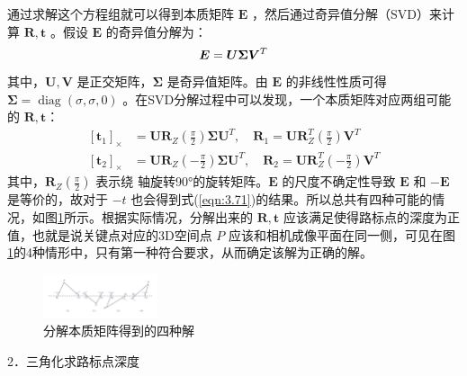 通过求解这个方程组就可以得到本质矩阵  $\bm{E} $ ，然后通过奇异值分解（SVD）来计算 $\boldsymbol{R}, \boldsymbol{t} $ 。假设  $\bm{E} $  的奇异值分解为：
\begin{equation}
\label{eqn:3.70}
\setlength{\abovedisplayskip}{6pt}
\setlength{\belowdisplayskip}{6pt}
\boldsymbol{E}= \boldsymbol{U} \boldsymbol{\Sigma} \boldsymbol{V}^{T}
\end{equation}
其中，$\boldsymbol{U},\boldsymbol{V} $ 是正交矩阵，$\boldsymbol{\Sigma} $ 是奇异值矩阵。由 $\bm{E} $ 的非线性性质可得 $\boldsymbol{\Sigma}=\operatorname{diag}(\sigma, \sigma, 0) $ 。在SVD分解过程中可以发现，一个本质矩阵对应两组可能的 $\boldsymbol{R}, \boldsymbol{t} $：
\begin{equation}
\label{eqn:3.71}
\begin{aligned}
\left[\boldsymbol{t}_{1}\right]_\times&= \boldsymbol{U} \boldsymbol{R}_{Z}\left(\frac{\pi}{2}\right) \boldsymbol{\Sigma} \boldsymbol{U}^{T}, \quad \boldsymbol{R}_{1}=\boldsymbol{U} \boldsymbol{R}_{Z}^{T}\left(\frac{\pi}{2}\right) \boldsymbol{V}^{T} \\
\left[\boldsymbol{t}_{2}\right]_\times &= \boldsymbol{U} \boldsymbol{R}_{Z}\left(-\frac{\pi}{2}\right) \boldsymbol{\Sigma} \boldsymbol{U}^{T}, \quad \boldsymbol{R}_{2}=\boldsymbol{U} \boldsymbol{R}_{Z}^{T}\left(-\frac{\pi}{2}\right) \boldsymbol{V}^{T} 
\end{aligned}
\end{equation}
其中，$\boldsymbol{R}_{Z}\left(\frac{\pi}{2}\right) $ 表示绕 轴旋转90°的旋转矩阵。$\bm{E} $ 的尺度不确定性导致 $\bm{E} $ 和 $-\bm{E} $ 是等价的，故对于 $-t$ 也会得到式(\ref{eqn:3.71})的结果。所以总共有四种可能的情况，如图\ref{fig3_9}所示。根据实际情况，分解出来的 $\boldsymbol{R}, \boldsymbol{t} $ 应该满足使得路标点的深度为正值，也就是说关键点对应的3D空间点 $P$ 应该和相机成像平面在同一侧，可见在图\ref{fig3_9}的4种情形中，只有第一种符合要求，从而确定该解为正确的解。
\begin{figure}[h]\setlength{\belowcaptionskip}{-12pt}
	\centering
	\includegraphics[width=0.3\textwidth, angle=-90]{figures/chapter3/fig3_9}
	\caption{分解本质矩阵得到的四种解}\label{fig3_9}
\end{figure}

2．三角化求路标点深度

